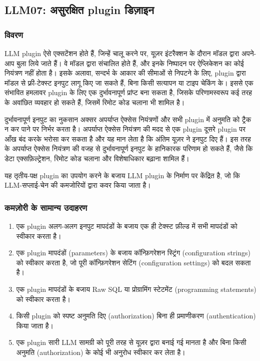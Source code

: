 \documentclass[
]{article}
\author{}
\date{}
\providecommand{\tightlist}{%
  \setlength{\itemsep}{0pt}\setlength{\parskip}{0pt}}
\begin{document}
\subsection{LLM07: असुरक्षित plugin
डिज़ाइन}\label{llm07-ux905ux938ux930ux915ux937ux924-plugin-ux921ux91cux907ux928}

\subsubsection{विवरण}\label{ux935ux935ux930ux923}

LLM plugin ऐसे एक्सटेंशन होते हैं, जिन्हें चालू करने पर, यूज़र इंटरैक्शन के दौरान मॉडल
द्वारा अपने-आप बुला लिये जाते हैं। वे मॉडल द्वारा संचालित होते हैं, और इनके निष्पादन पर
ऐप्लिकेशन का कोई नियंत्रण नहीं होता है। इसके अलावा, सन्दर्भ के आकार की सीमाओं से
निपटने के लिए, plugin द्वारा मॉडल से फ़्री-टेक्स्ट इनपुट लागू किए जा सकते हैं, बिना
किसी सत्यापन या टाइप चेकिंग के। इससे एक संभावित हमलावर plugin के लिए एक
दुर्भावनापूर्ण प्रांप्ट बना सकता है, जिसके परिणामस्वरूप कई तरह के अवांछित व्यवहार हो
सकते हैं, जिसमें रिमोट कोड चलाना भी शामिल है।

दुर्भावनापूर्ण इनपुट का नुकसान अक्सर अपर्याप्त ऐक्सेस नियंत्रणों और सभी plugin में अनुमति
को ट्रैक न कर पाने पर निर्भर करता है। अपर्याप्त ऐक्सेस नियंत्रण की मदद से एक plugin
दूसरे plugin पर आँख बंद करके भरोसा कर सकता है और यह मान लेता है कि अंतिम यूज़र ने
इनपुट दिए हैं। इस तरह के अपर्याप्त ऐक्सेस नियंत्रण की वजह से दुर्भावनापूर्ण इनपुट के
हानिकारक परिणाम हो सकते हैं, जैसे कि डेटा एक्सफ़िल्ट्रेशन, रिमोट कोड चलाना और
विशेषाधिकार बढ़ाना शामिल हैं।

यह तृतीय-पक्ष plugin का उपयोग करने के बजाय LLM plugin के निर्माण पर केंद्रित है,
जो कि LLM-सप्लाई-चेन की कमजोरियों द्वारा कवर किया जाता है।

\subsubsection{कमज़ोरी के सामान्य
उदाहरण}\label{ux915ux92eux95bux930-ux915-ux938ux92eux928ux92f-ux909ux926ux939ux930ux923}

\begin{enumerate}
\def\labelenumi{\arabic{enumi}.}
\tightlist
\item
  एक plugin अलग-अलग इनपुट मापदंडों के बजाय एक ही टेक्स्ट फ़ील्ड में सभी मापदंडों को
  स्वीकार करता है।
\item
  एक plugin मापदंडों (parameters) के बजाय कॉन्फ़िगरेशन स्ट्रिंग (configuration
  strings) को स्वीकार करता है, जो पूरी कॉन्फ़िगरेशन सेटिंग (configuration
  settings) को बदल सकता है।
\item
  एक plugin मापदंडों के बजाय Raw SQL या प्रोग्रामिंग स्टेटमेंट (programming
  statements) को स्वीकार करता है।
\item
  किसी plugin को स्पष्ट अनुमति दिए (authorization) बिना ही प्रमाणीकरण
  (authentication) किया जाता है।
\item
  एक plugin सारी LLM सामग्री को पूरी तरह से यूज़र द्वारा बनाई गई मानता है और
  बिना किसी अनुमति (authorization) के कोई भी अनुरोध स्वीकार कर लेता है।
\end{enumerate}
\end{document}
